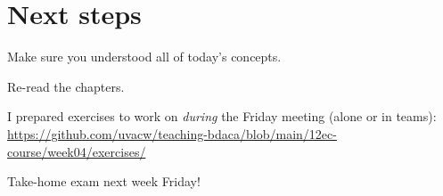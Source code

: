 
\section{Next steps}

\begin{frame}[standout]
Make sure you understood all of today's concepts.

Re-read the chapters.

I prepared exercises to work on \emph{during} the Friday meeting (alone or in teams):
\large{\url{https://github.com/uvacw/teaching-bdaca/blob/main/12ec-course/week04/exercises/}}
\end{frame}


\begin{frame}[standout]
Take-home exam next week Friday!
\end{frame}





\begin{frame}
	\printbibliography
\end{frame}




